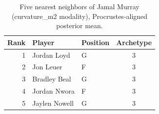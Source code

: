 \begin{table}[htbp]
  \centering\small
  \begin{tabular}{rllc}
    \toprule
    Rank & Player & Position & Archetype \\
    \midrule
    1 & Jordan Loyd & G & 3 \\
    2 & Jon Leuer & F & 3 \\
    3 & Bradley Beal & G & 3 \\
    4 & Jordan Nwora & F & 3 \\
    5 & Jaylen Nowell & G & 3 \\
    \bottomrule
  \end{tabular}
  \caption{Five nearest neighbors of Jamal Murray (curvature_m2 modality), Procrustes-aligned posterior mean.}
  \label{tab:Jamal_Murray_neighbors_curvature_m2}
\end{table}

